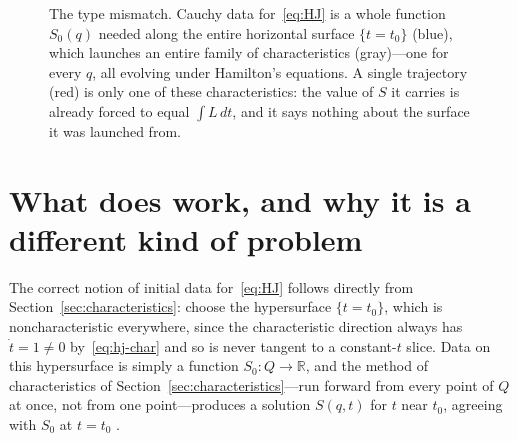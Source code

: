 \documentclass[11pt]{article}
\newcommand{\R}{\mathbb{R}}
\begin{document}
\begin{figure}[htbp]
\centering
{}
\caption{The type mismatch. Cauchy data for~\eqref{eq:HJ} is a whole function $S_0(q)$ needed along the entire horizontal surface $\{t=t_0\}$ (blue), which launches an entire family of characteristics (gray)---one for every $q$, all evolving under Hamilton's equations. A single trajectory (red) is only one of these characteristics: the value of $S$ it carries is already forced to equal $\int L\,dt$, and it says nothing about the surface it was launched from.}
\label{fig:surface-vs-curve}
\end{figure}

\section{What does work, and why it is a different kind of problem}
\label{sec:cauchy}

The correct notion of initial data for~\eqref{eq:HJ} follows directly from Section~\ref{sec:characteristics}: choose the hypersurface $\{t=t_0\}$, which is noncharacteristic everywhere, since the characteristic direction always has $\dot t=1\neq0$ by~\eqref{eq:hj-char} and so is never tangent to a constant-$t$ slice. Data on this hypersurface is simply a function $S_0:Q\to\R$, and the method of characteristics of Section~\ref{sec:characteristics}---run forward from every point of $Q$ at once, not from one point---produces a solution $S(q,t)$ for $t$ near $t_0$, agreeing with $S_0$ at $t=t_0$ \citep{evans2010}.
\end{document}
